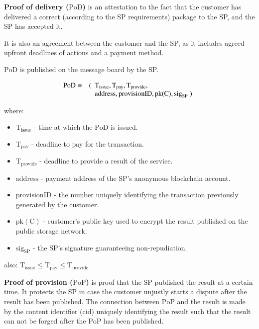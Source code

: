 \noindent \textbf
{Proof of delivery ($\mathrm{PoD}$)}\label{proof-of-delivery} is an attestation to the fact that the customer has delivered a correct (according to the SP requirements) package to the SP, and the SP has accepted it.

It is also an agreement between the customer and the SP, as it includes agreed upfront deadlines of actions and a payment method.

$\mathrm{PoD}$ is published on the message board by the SP.

\begin{eqnarray}
\mathrm{PoD} & \equiv & (\begin{array}[t]{l}\mathrm{T}_\mathrm{issue}, \mathrm{T}_\mathrm{pay}, \mathrm{T}_\mathrm{provide},\\ \mathrm{address}, \mathrm{provisionID}, \mathrm{pk(C)}, \mathrm{sig}_\mathrm{SP} \; )\end{array}
\end{eqnarray}

where:

\begin{itemize}

\item $\mathrm{T}_\mathrm{issue}$ - time at which the $\mathrm{PoD}$ is issued.
\item
  $\mathrm{T}_\mathrm{pay}$ - deadline to pay for the transaction.
\item
  $\mathrm{T}_\mathrm{provide}$ - deadline to provide a result of the service.
\item $\mathrm{address}$ - payment address of the SP's anonymous blockchain account.
\item $\mathrm{provisionID}$ - the number uniquely identifying the transaction previously generated by the customer.
\item $\mathrm{pk(C)}$ - customer's public key used to encrypt the result published on the public storage network.
\item $\mathrm{sig}_\mathrm{SP}$ - the SP's signature guaranteeing non-repudiation.
\end{itemize}

also:
\(\mathrm{T}_\mathrm{issue} \leq \mathrm{T}_\mathrm{pay} \leq \mathrm{T}_\mathrm{provide}\)

\noindent \textbf
{Proof of provision ($\mathrm{PoP}$)}\label{proof-of-provision} is proof that the SP published the result at a certain time. It protects the SP in case the customer unjustly starts a dispute after the result has been published. The connection between $\mathrm{PoP}$ and the result is made by the content identifier ($\mathrm{cid}$) uniquely identifying the result such that the result can not be forged after the $\mathrm{PoP}$ has been published.

